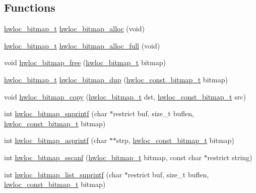 \subsection*{Functions}
\begin{DoxyCompactItemize}
\item 
 \hyperlink{a00065_gaa3c2bf4c776d603dcebbb61b0c923d84}{hwloc\_\-bitmap\_\-t} \hyperlink{a00065_ga9fb6aedc30d4ef4998fa53e2403b6130}{hwloc\_\-bitmap\_\-alloc} (void) 
\item 
 \hyperlink{a00065_gaa3c2bf4c776d603dcebbb61b0c923d84}{hwloc\_\-bitmap\_\-t} \hyperlink{a00065_gadd4479485685bda179f4b8b9b70f671e}{hwloc\_\-bitmap\_\-alloc\_\-full} (void) 
\item 
 void \hyperlink{a00065_ga8e7035fe555ef96921bfb98e08519bc7}{hwloc\_\-bitmap\_\-free} (\hyperlink{a00065_gaa3c2bf4c776d603dcebbb61b0c923d84}{hwloc\_\-bitmap\_\-t} bitmap)
\item 
 \hyperlink{a00065_gaa3c2bf4c776d603dcebbb61b0c923d84}{hwloc\_\-bitmap\_\-t} \hyperlink{a00065_gaaa4ed76211cd3694dfbea2109fc440be}{hwloc\_\-bitmap\_\-dup} (\hyperlink{a00065_ga2fb1bbc8aea1ea22dee2f0fd39659f48}{hwloc\_\-const\_\-bitmap\_\-t} bitmap) 
\item 
 void \hyperlink{a00065_gab14743355fa03b36cef521cbcd2fbf64}{hwloc\_\-bitmap\_\-copy} (\hyperlink{a00065_gaa3c2bf4c776d603dcebbb61b0c923d84}{hwloc\_\-bitmap\_\-t} dst, \hyperlink{a00065_ga2fb1bbc8aea1ea22dee2f0fd39659f48}{hwloc\_\-const\_\-bitmap\_\-t} src)
\item 
 int \hyperlink{a00065_ga6c0d60db98f27276752c1e5fafcbd7d1}{hwloc\_\-bitmap\_\-snprintf} (char $\ast$restrict buf, size\_\-t buflen, \hyperlink{a00065_ga2fb1bbc8aea1ea22dee2f0fd39659f48}{hwloc\_\-const\_\-bitmap\_\-t} bitmap)
\item 
 int \hyperlink{a00065_gad3cf87ceb58aa91656756bbb58057320}{hwloc\_\-bitmap\_\-asprintf} (char $\ast$$\ast$strp, \hyperlink{a00065_ga2fb1bbc8aea1ea22dee2f0fd39659f48}{hwloc\_\-const\_\-bitmap\_\-t} bitmap)
\item 
 int \hyperlink{a00065_ga553cd5ceb1925bfd31788e70b4a46ae8}{hwloc\_\-bitmap\_\-sscanf} (\hyperlink{a00065_gaa3c2bf4c776d603dcebbb61b0c923d84}{hwloc\_\-bitmap\_\-t} bitmap, const char $\ast$restrict string)
\item 
 int \hyperlink{a00065_gab94b52560ea4333663895b3276e89af2}{hwloc\_\-bitmap\_\-list\_\-snprintf} (char $\ast$restrict buf, size\_\-t buflen, \hyperlink{a00065_ga2fb1bbc8aea1ea22dee2f0fd39659f48}{hwloc\_\-const\_\-bitmap\_\-t} bitmap)
\item 
$$
\end{DoxyCompactItemize}
